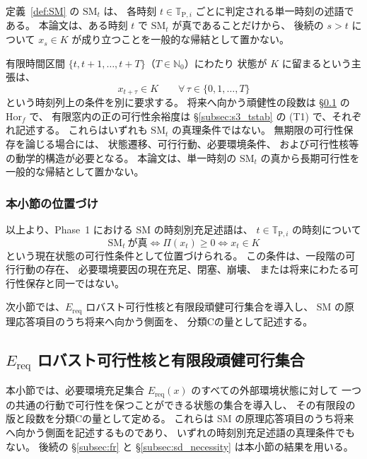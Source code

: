 \begin{remark}[単一時刻条件と時間的維持の区別]
\label{rem:sm_temporal_scope}
定義~\ref{def:SM} の $\mathrm{SM}_t$ は、
各時刻 $t\in\mathbb{T}_{\mathrm{P},i}$ ごとに判定される単一時刻の述語である。
本論文は、ある時刻 $t$ で $\mathrm{SM}_t$ が真であることだけから、
後続の $s>t$ について $x_s\in K$ が成り立つことを一般的な帰結として置かない。

有限時間区間 $\{t,t+1,\ldots,t+T\}$（$T\in\mathbb{N}_0$）にわたり
状態が $K$ に留まるという主張は、
\[
  x_{t+\tau}\in K
  \qquad
  \forall\,\tau\in\{0,1,\ldots,T\}
\]
という時刻列上の条件を別に要求する。
将来へ向かう頑健性の段数は
\S\ref{subsec:viab_core} の $\mathrm{Hor}_f$ で、
有限窓内の正の可行性余裕度は
\S\ref{subsec:s3_tstab} の (T1) で、それぞれ記述する。
これらはいずれも $\mathrm{SM}_t$ の真理条件ではない。
無期限の可行性保存を論じる場合には、
状態遷移、可行行動、必要環境条件、
および可行性核等の動学的構造が必要となる。
本論文は、単一時刻の $\mathrm{SM}_t$ の真から長期可行性を一般的な帰結として置かない。
\end{remark}

\subsubsection{本小節の位置づけ}

以上より、Phase~1 における SM の時刻別充足述語は、
$t\in\mathbb{T}_{\mathrm{P},i}$ の時刻について
\[
  \mathrm{SM}_t\ \text{が真}
  \iff
  \Pi(x_t)\ge0
  \iff
  x_t\in K
\]
という現在状態の可行性条件として位置づけられる。
この条件は、一段階の可行行動の存在、
必要環境要因の現在充足、閉塞、崩壊、
または将来にわたる可行性保存と同一ではない。

次小節では、$E_{\mathrm{req}}$ ロバスト可行性核と有限段頑健可行集合を導入し、
SM の原理応答項目のうち将来へ向かう側面を、
分類Cの量として記述する。

\subsection{$E_{\mathrm{req}}$ ロバスト可行性核と有限段頑健可行集合}
\label{subsec:viab_core}

本小節では、必要環境充足集合 $E_{\mathrm{req}}(x)$ のすべての外部環境状態に対して
一つの共通の行動で可行性を保つことができる状態の集合を導入し、
その有限段の版と段数を分類Cの量として定める。
これらは SM の原理応答項目のうち将来へ向かう側面を記述するものであり、
いずれの時刻別充足述語の真理条件でもない。
後続の \S\ref{subsec:fr} と \S\ref{subsec:sd_necessity} は本小節の結果を用いる。

